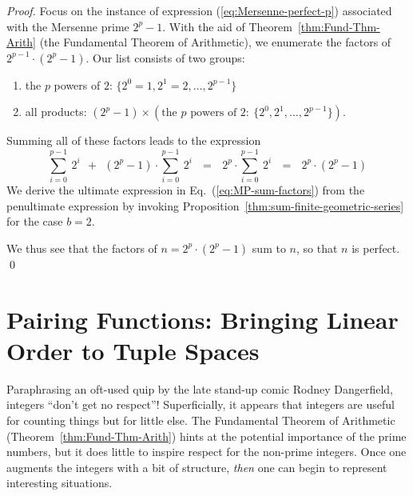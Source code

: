\begin{proof}
Focus on the instance of expression (\ref{eq:Mersenne-perfect-p}) associated with the Mersenne prime $2^p-1$.  With the aid of Theorem~\ref{thm:Fund-Thm-Arith} (the Fundamental Theorem of Arithmetic), we enumerate the factors of $2^{p-1} \cdot (2^p-1)$.  Our list consists of two groups:
\begin{enumerate}
\item
the $p$ powers of $2$:  $\{2^0 =1, 2^1 = 2, \ldots, 2^{p-1}\}$
\medskip\item
all products: $(2^p-1) \times \left( 
\mbox{the $p$ powers of } 2: \ \{ 2^0, 2^1, \ldots, 2^{p-1}\} \right)$.
\end{enumerate}

\smallskip

\noindent
Summing all of these factors leads to the expression
\begin{equation}
\label{eq:MP-sum-factors}
\sum_{i=0}^{p-1} \ 2^i \ \ + \ \ (2^p-1) \cdot \sum_{i=0}^{p-1} \ 2^i
 \ \ \ = \ \ \  2^p \cdot \sum_{i=0}^{p-1} \ 2^i
 \ \ \ = \ \ \ 2^p \cdot (2^p -1)
\end{equation}
We derive the ultimate expression in Eq.~(\ref{eq:MP-sum-factors}) from the penultimate expression by invoking Proposition~\ref{thm:sum-finite-geometric-series} for the case $b=2$.

\smallskip

We thus see that the factors of $n = 2^p \cdot (2^p -1)$ sum to $n$, so that $n$ is perfect.  \qed
\end{proof}


\section{Pairing Functions: Bringing Linear Order to Tuple Spaces}
\label{sec:pairing}

Paraphrasing an oft-used quip by the late stand-up comic Rodney Dangerfield, integers ``don't get no respect''!  Superficially, it appears that integers are useful for counting things but for little else.  The Fundamental Theorem of Arithmetic (Theorem~\ref{thm:Fund-Thm-Arith}) hints at the potential importance of the prime numbers, but it does little to inspire respect for the non-prime integers.  Once one augments the integers with a bit of structure, {\em then} one can begin to represent interesting situations.


